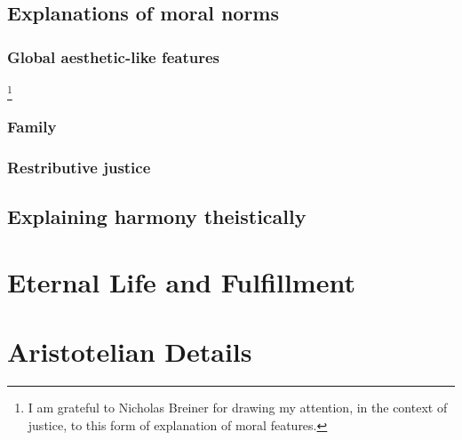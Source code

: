 \section{Explanations of moral norms}
\subsection{Global aesthetic-like features}\footnote{I am grateful to Nicholas Breiner for drawing my attention, in the context of
justice, to this form of explanation of moral features.}
\subsection{Family}
\subsection{Restributive justice}

\section{Explaining harmony theistically}
\chaptertail

\def\mychapter{IX}

\chapter{Eternal Life and Fulfillment}\label{ch:eternal-life}
\chaptertail

\def\mychapter{X}

\chapter{Aristotelian Details}\label{ch:details}
\chaptertail
